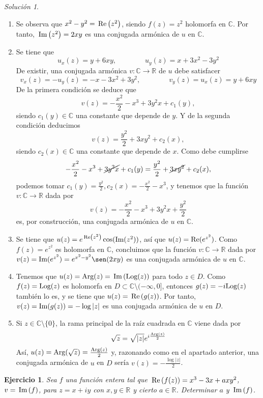 \documentclass[11pt]{report}
\newcommand{\R}{\mathbb R}
\newcommand{\C}{\mathbb C}
\newcommand{\pars}[1]{\left( #1 \right)} %
\renewcommand{\Re}[1]{\,\textup{Re}\pars{#1}}
\renewcommand{\Im}[1]{\,\textup{Im}\pars{#1}}
\newtheorem{exercise}{Ejercicio}
\theoremstyle{remark}
\newtheorem*{resolution}{Solución}
\begin{document}
\begin{resolution}
\hfill
\begin{enumerate}
    \item Se observa que $x^2-y^2 = \Re{z^2}$, siendo $f(z) = z^2$ holomorfa en $\C$. Por tanto, $\Im{z^2} = 2xy$ es una conjugada armónica de $u$ en $\C$.
    \item Se tiene que
    \[u_x(z) = y+6xy, \qquad \qquad u_y(z) = x+3x^2-3y^2\]
    De existir, una conjugada armónica $v \colon \C \to \R$ de $u$ debe satisfacer 
    \[v_x(z) = -u_y(z) = -x-3x^2+3y^2, \qquad \qquad v_y(z) = u_x(z) = y+6xy\]
    De la primera condición se deduce que
    \[v(z) = -\frac{x^2}{2}-x^3+3y^2x+c_1(y),\]
    siendo $c_1(y) \in \C$ una constante que depende de $y$. Y de la segunda condición deducimos
    \[v(z) = \frac{y^2}{2}+3xy^2+c_2(x),\]
    siendo $c_2(x) \in \C$ una constante que depende de $x$. Como debe cumplirse
    \[-\frac{x^2}{2}-x^3+\cancel{3y^2x}+c_1(y) = \frac{y^2}{2}+\cancel{3xy^2}+c_2(x),\]
    podemos tomar $c_1(y) = \frac{y^2}{2}, c_2(x) = -\frac{x^2}{2}-x^3$, y tenemos que la función $v \colon \C \to \R$ dada por
    \[v(z) = -\frac{x^2}{2}-x^3+3y^2x+\frac{y^2}{2}\]
    es, por construcción, una conjugada armónica de $u$ en $\C$.
    \item Se tiene que $u(z) = e^{\Re{z^2}}\cos(\textup{Im}(z^2))$, así que $u(z) = \textup{Re}(e^{z^2})$. Como $f(z)= e^{z^2}$ es holomorfa en $\C$, concluimos que la función $v \colon \C \to \R$ dada por $v(z) = \textup{Im}(e^{z^2})= e^{x^2-y^2}\sen(2xy)$ es una conjugada armónica de $u$ en $\C$.
    \item Tenemos que $u(z) =\textup{Arg}(z) = \Im{\textup{Log}(z)}$ para todo $z \in D$. Como $f(z)=\textup{Log}(z)$ es holomorfa en $D \subset \C \setminus (-\infty,0]$, entonces $g(z) = -i\textup{Log}(z)$ también lo es, y se tiene que $u(z) = \Re{g(z)}$. Por tanto, $v(z) = \textup{Im}(g(z)) 
    =-\log|z|$ es una conjugada armónica de $u$ en $D$.
    \item Si $z \in \C \setminus\{0\}$, la rama principal de la raíz cuadrada en $\C$ viene dada por \[\sqrt{z} = \sqrt{|z|}e^{i\frac{\textup{Arg}(z)}{2}}\] Así, $u(z) = \textup{Arg}(\sqrt{z}) = \frac{\textup{Arg}(z)}{2}$ y, razonando como en el apartado anterior, una conjugada armónica de $u$ en $D$ sería $v(z) = -\frac{\log|z|}{2}$.
\end{enumerate}
\end{resolution}

\begin{exercise}
Sea $f$ una función entera tal que $\Re{f(z)} = x^3-3x+axy^2$, $v = \Im{f}$, para $z = x+iy$ con $x,y \in \R$ y cierto $a \in \R$. Determinar $a$ y $\Im{f}$.
\end{exercise}
\end{document}
